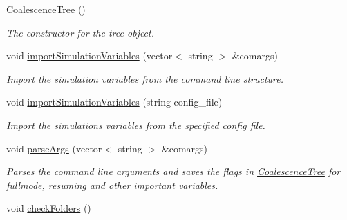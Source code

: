 \begin{DoxyCompactItemize}
\item 
\hyperlink{class_tree_ad376a7c639d857312f5de2ef47482f68}{CoalescenceTree} ()
\begin{DoxyCompactList}\small\item\em The constructor for the tree object. \end{DoxyCompactList}\item 
void \hyperlink{class_tree_a46fbbf6c52f7b2bfebb1ae0aac4df724}{import\+Simulation\+Variables} (vector$<$ string $>$ \&comargs)
\begin{DoxyCompactList}\small\item\em Import the simulation variables from the command line structure. \end{DoxyCompactList}\item 
void \hyperlink{class_tree_a8efc9557eb11e41dfdfd7c2c83682e06}{import\+Simulation\+Variables} (string config\+\_\+file)
\begin{DoxyCompactList}\small\item\em Import the simulations variables from the specified config file. \end{DoxyCompactList}\item 
void \hyperlink{class_tree_a518a17560e8550c650f3a76718580ff5}{parse\+Args} (vector$<$ string $>$ \&comargs)
\begin{DoxyCompactList}\small\item\em Parses the command line arguments and saves the flags in \hyperlink{class_tree}{CoalescenceTree} for fullmode, resuming and other important variables. \end{DoxyCompactList}\item
void \hyperlink{class_tree_a322dfcd92942d2143fb3a9e70b81e026}{check\+Folders} ()\hypertarget{class_tree_a322dfcd92942d2143fb3a9e70b81e026}{}\label{class_tree_a322dfcd92942d2143fb3a9e70b81e026}


\end{DoxyCompactItemize}
